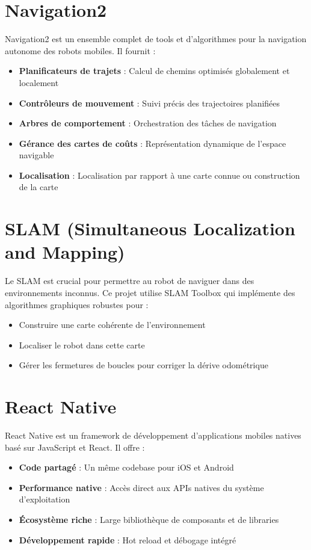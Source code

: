 \documentclass[12pt,a4paper,oneside]{report}
\begin{document}
\section{Navigation2}

Navigation2 est un ensemble complet de tools et d'algorithmes pour la navigation autonome des robots mobiles. Il fournit :

\begin{itemize}
  \item \textbf{Planificateurs de trajets} : Calcul de chemins optimisés globalement et localement
  \item \textbf{Contrôleurs de mouvement} : Suivi précis des trajectoires planifiées
  \item \textbf{Arbres de comportement} : Orchestration des tâches de navigation
  \item \textbf{Gérance des cartes de coûts} : Représentation dynamique de l'espace navigable
  \item \textbf{Localisation} : Localisation par rapport à une carte connue ou construction de la carte
\end{itemize}

\section{SLAM (Simultaneous Localization and Mapping)}

Le SLAM est crucial pour permettre au robot de naviguer dans des environnements inconnus. Ce projet utilise SLAM Toolbox qui implémente des algorithmes graphiques robustes pour :

\begin{itemize}
  \item Construire une carte cohérente de l'environnement
  \item Localiser le robot dans cette carte
  \item Gérer les fermetures de boucles pour corriger la dérive odométrique
\end{itemize}

\section{React Native}

React Native est un framework de développement d'applications mobiles natives basé sur JavaScript et React. Il offre :

\begin{itemize}
  \item \textbf{Code partagé} : Un même codebase pour iOS et Android
  \item \textbf{Performance native} : Accès direct aux APIs natives du système d'exploitation
  \item \textbf{Écosystème riche} : Large bibliothèque de composants et de libraries
  \item \textbf{Développement rapide} : Hot reload et débogage intégré
\end{itemize}
\end{document}
